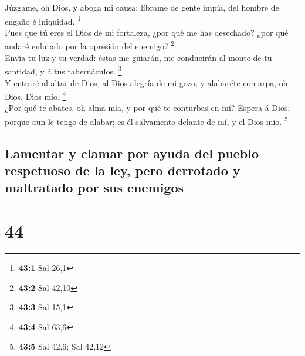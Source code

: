  Júzgame, oh Dios, y aboga mi causa: líbrame de gente impía,
del hombre de engaño é iniquidad. \footnote{\textbf{43:1} Sal 26,1}\\
 Pues que tú eres el Dios de mi fortaleza, ¿por qué me has
desechado? ¿por qué andaré enlutado por la opresión del enemigo?
\footnote{\textbf{43:2} Sal 42,10}\\
 Envía tu luz y tu verdad: éstas me guiarán, me conducirán
al monte de tu santidad, y á tus tabernáculos. \footnote{\textbf{43:3}
  Sal 15,1}\\
 Y entraré al altar de Dios, al Dios alegría de mi gozo; y
alabaréte con arpa, oh Dios, Dios mío. \footnote{\textbf{43:4} Sal 63,6}\\
 ¿Por qué te abates, oh alma mía, y por qué te conturbas en
mí? Espera á Dios; porque aun le tengo de alabar; es él salvamento
delante de mí, y el Dios mío. \footnote{\textbf{43:5} Sal 42,6; Sal
  42,12}

\hypertarget{lamentar-y-clamar-por-ayuda-del-pueblo-respetuoso-de-la-ley-pero-derrotado-y-maltratado-por-sus-enemigos}{%
\subsection{Lamentar y clamar por ayuda del pueblo respetuoso de la ley,
pero derrotado y maltratado por sus
enemigos}\label{lamentar-y-clamar-por-ayuda-del-pueblo-respetuoso-de-la-ley-pero-derrotado-y-maltratado-por-sus-enemigos}}

\hypertarget{section-43}{%
\section{44}\label{section-43}}

